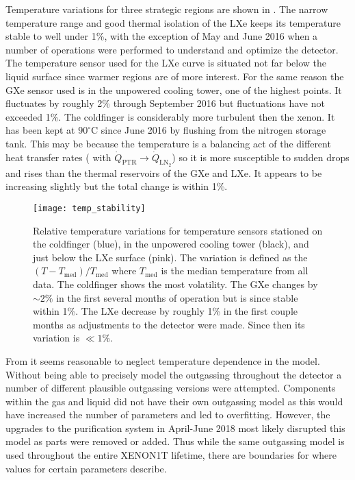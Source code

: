 Temperature variations for three strategic regions are shown in .  The
narrow temperature range and good thermal isolation of the LXe keeps its temperature stable to well under 1\%, with the exception of May
and June 2016 when a number of operations were performed to understand and optimize the detector.  The temperature sensor used for the
LXe curve is situated not far below the liquid surface since warmer regions are of more interest.  For the same reason the GXe sensor used
is in the unpowered cooling tower, one of the highest points.  It fluctuates by roughly 2\% through September 2016 but fluctuations have
not exceeded 1\%.  The  coldfinger is considerably more turbulent then the xenon.  It has been kept at $90^{\circ}\mathrm{C}$
since June 2016 by flushing  from the nitrogen storage tank.  This may be because the temperature is a balancing act of the
different heat transfer rates ( with
$\dot{Q}_{\mathrm{PTR}} \rightarrow \dot{Q}_{\mathrm{LN_2}}$) so it is more susceptible to sudden drops and
rises than the thermal reservoirs of the GXe and LXe.  It appears to be increasing slightly but the total change is within 1\%.

\begin{figure}
\centering
\texttt{[image: temp\_stability]}
\caption{Relative temperature variations for temperature sensors stationed on the  coldfinger (blue), in the unpowered cooling
tower (black), and just below the LXe surface (pink).  The variation is defined as the $(T - T_{\mathrm{med}}) / T_{\mathrm{med}}$ where
$T_{\mathrm{med}}$ is the median temperature from all data.  The  coldfinger shows the most volatility.  The GXe changes by
${\sim}2\%$ in the first several months of operation but is since stable within 1\%.  The LXe decrease by roughly 1\% in the first couple
months as adjustments to the detector were made.  Since then its variation is $\ll 1\%$.}
\label{fig:electron_lifetime_model_outgassing_temp_stability}
\end{figure}

From  it seems reasonable to neglect temperature dependence in the model.  Without
being able to precisely model the outgassing throughout the detector a number of different plausible outgassing versions were
attempted.  Components within the gas and liquid did not have their own outgassing model as this would have increased the number of
parameters and led to overfitting.  However, the upgrades to the purification system in April-June 2018 most likely disrupted this model
as parts were removed or added.  Thus while the same outgassing model is used throughout the entire XENON1T lifetime, there are boundaries
for where values for certain parameters describe.

